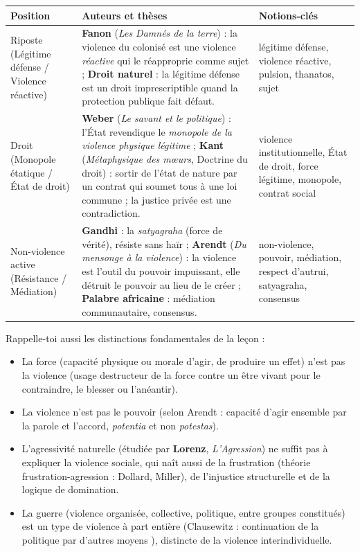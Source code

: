 \documentclass[11pt]{article}
\newcommand{\cle}[1]{{\popxbold\color{popdark}#1}}
\newcounter{popsec}
\newcounter{popsub}
\newcommand{\courssub}[1]{%
  \stepcounter{popsub}%
  \par\vspace{9pt}\noindent{\popxbold\fontsize{11.5}{13}\selectfont\color{popink}{\color{poporange}\thepopsec.\thepopsub}\hspace{6pt}#1}\par\nopagebreak\vspace{4pt}
}
\begin{document}
\courssub{Ressources à mobiliser}

\begin{center}
\begin{tabularx}{\linewidth}{|l|X|X|}\hline
\rowcolor{popblueL}
\textbf{Position} & \textbf{Auteurs et thèses} & \textbf{Notions-clés} \\ \hline
Riposte (Légitime défense / Violence réactive) & \textbf{Fanon} (\emph{Les Damnés de la terre}) : la violence du colonisé est une violence \emph{réactive} qui le réapproprie comme sujet ; \textbf{Droit naturel} : la légitime défense est un droit imprescriptible quand la protection publique fait défaut. & légitime défense, violence réactive, pulsion, thanatos, sujet \\ \hline
Droit (Monopole étatique / État de droit) & \textbf{Weber} (\emph{Le savant et le politique}) : l'État revendique le \emph{monopole de la violence physique légitime} ; \textbf{Kant} (\emph{Métaphysique des mœurs}, Doctrine du droit) : sortir de l'état de nature par un contrat qui soumet tous à une loi commune ; la justice privée est une contradiction. & violence institutionnelle, État de droit, force légitime, monopole, contrat social \\ \hline
Non-violence active (Résistance / Médiation) & \textbf{Gandhi} : la \emph{satyagraha} (force de vérité), résiste sans haïr ; \textbf{Arendt} (\emph{Du mensonge à la violence}) : la violence est l'outil du pouvoir impuissant, elle détruit le pouvoir au lieu de le créer ; \textbf{Palabre africaine} : médiation communautaire, consensus. & non-violence, pouvoir, médiation, respect d'autrui, satyagraha, consensus \\ \hline
\end{tabularx}
\end{center}

Rappelle-toi aussi les distinctions fondamentales de la leçon :
\begin{itemize}
\item La \cle{force} (capacité physique ou morale d'agir, de produire un effet) n'est pas la \cle{violence} (usage destructeur de la force contre un être vivant pour le contraindre, le blesser ou l'anéantir).
\item La violence n'est pas le \cle{pouvoir} (selon Arendt : capacité d'agir ensemble par la parole et l'accord, \emph{potentia} et non \emph{potestas}).
\item L'agressivité naturelle (étudiée par \textbf{Lorenz}, \emph{L'Agression}) ne suffit pas à expliquer la violence sociale, qui naît aussi de la frustration (théorie frustration-agression : Dollard, Miller), de l'injustice structurelle et de la logique de domination.
\item La \cle{guerre} (violence organisée, collective, politique, entre groupes constitués) est un type de violence à part entière (Clausewitz : \guillemotleft continuation de la politique par d'autres moyens \guillemotright), distincte de la violence interindividuelle.
\end{itemize}
\end{document}
